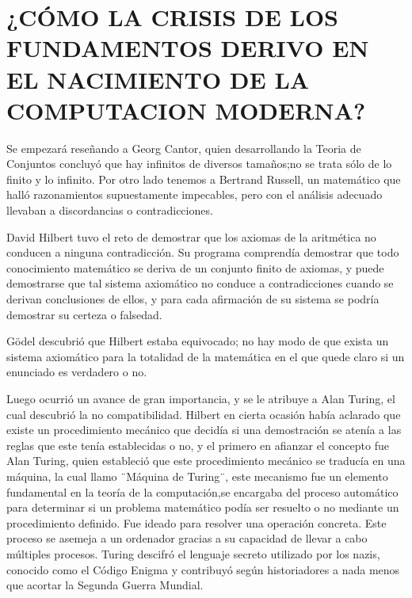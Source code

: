\documentclass[12pt]{article}
\begin{document}
\newpage

\section{¿CÓMO LA CRISIS DE LOS FUNDAMENTOS DERIVO EN EL NACIMIENTO DE LA COMPUTACION MODERNA?}
\large

Se empezará reseñando a Georg Cantor, quien desarrollando la Teoria de Conjuntos concluyó que hay infinitos de diversos tamaños;no se trata sólo de lo finito y lo infinito. Por otro lado tenemos a Bertrand Russell, un matemático que halló razonamientos supuestamente impecables, pero con el análisis adecuado llevaban a discordancias o contradicciones.

\vspace{10PT}
David Hilbert tuvo el reto de demostrar que los axiomas de la aritmética no conducen a ninguna contradicción. Su programa comprendía demostrar que todo conocimiento matemático se deriva de un conjunto finito de axiomas, y puede demostrarse que tal sistema axiomático no conduce a contradicciones cuando se derivan conclusiones de ellos, y para cada afirmación de su sistema se podría demostrar su certeza o falsedad.

\vspace{15PT}
Gödel descubrió que Hilbert estaba equivocado; no hay modo de que exista un sistema axiomático para la totalidad de la matemática en el que quede claro si un enunciado es verdadero o no.

\vspace{15PT}
Luego ocurrió un avance de gran importancia, y se le atribuye a Alan Turing, el cual descubrió la no compatibilidad. Hilbert en cierta ocasión había aclarado que existe un procedimiento mecánico que decidía si una demostración se atenía a las reglas que este tenía establecidas o no, y el primero en afianzar el concepto fue Alan Turing, quien estableció que este procedimiento mecánico se traducía en una máquina, la cual llamo ¨Máquina de Turing¨, este mecanismo fue un elemento fundamental en la teoría de la computación,se encargaba del proceso automático para determinar si un problema matemático podía ser resuelto o no mediante un procedimiento definido. Fue ideado para resolver una operación concreta. Este proceso se asemeja a un ordenador gracias a su capacidad de llevar a cabo múltiples procesos.
Turing descifró el lenguaje secreto utilizado por los nazis, conocido como el Código Enigma y contribuyó según historiadores a nada menos que acortar la Segunda Guerra Mundial.
\newpage
\end{document}
